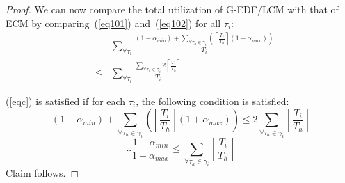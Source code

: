 \documentclass[letter]{sig-alternate}
\begin{document}
\begin{proof}
We can now compare the total utilization of G-EDF/LCM with that of ECM by comparing~(\ref{eq101}) and~(\ref{eq102}) for all $\tau_i$:
\begin{eqnarray}
& & \sum_{\forall \tau_{i}}\frac{(1-\alpha_{min})+\sum_{\forall \tau_{h}\in\gamma_{i}}\left(\left\lceil\frac{T_{i}}{T_{h}}\right\rceil(1+\alpha_{max})\right)}{T_{i}} \nonumber\\
& \le &   \sum_{\forall \tau_{i}}\frac{\sum_{\forall \tau_{h}\in\gamma_{i}}2\left\lceil\frac{T_{i}}{T_{h}}\right\rceil}{T_{i}}\label{eqc}\end{eqnarray}

(\ref{eqc}) is satisfied if for each $\tau_{i}$, the following condition is satisfied:
\begin{equation*}
(1-\alpha_{min})+\sum_{\forall \tau_h \in \gamma_i}\left(\left\lceil\frac{T_{i}}{T_{h}}\right\rceil(1+\alpha_{max})\right)  \le  2\sum_{\forall \tau_h \in \gamma_i}\left\lceil\frac{T_{i}}{T_{h}}\right\rceil
\end{equation*}
\begin{equation*}
\therefore\frac{1-\alpha_{min}}{1-\alpha_{max}}  \le  \sum_{\forall \tau_h \in \gamma_i}\left\lceil\frac{T_{i}}{T_{h}}\right\rceil
\end{equation*}
Claim follows.
\end{proof}

\end{document}
